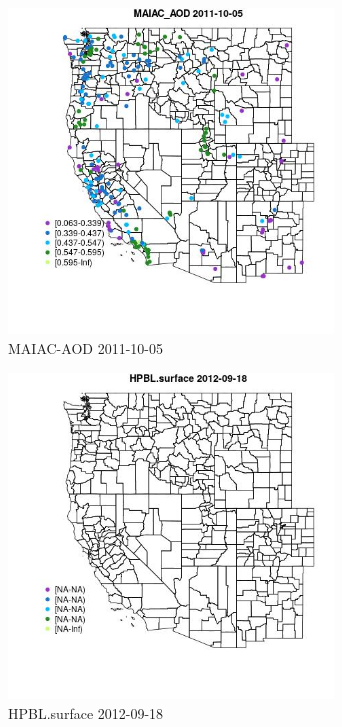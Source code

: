 \clearpage 

\begin{figure} 
\centering  
\includegraphics[width=0.77\textwidth]{Code_Outputs/ML_input_report_ML_input_PM25_Step5_part_d_de_duplicated_aves_ML_input_MapObsMAIAC_AOD2011-10-05.jpg} 
\caption{\label{fig:ML_input_report_ML_input_PM25_Step5_part_d_de_duplicated_aves_ML_inputMapObsMAIAC_AOD2011-10-05}MAIAC-AOD 2011-10-05} 
\end{figure} 
 

\begin{figure} 
\centering  
\includegraphics[width=0.77\textwidth]{Code_Outputs/ML_input_report_ML_input_PM25_Step5_part_d_de_duplicated_aves_ML_input_MapObsHPBLsurface2012-09-18.jpg} 
\caption{\label{fig:ML_input_report_ML_input_PM25_Step5_part_d_de_duplicated_aves_ML_inputMapObsHPBLsurface2012-09-18}HPBL.surface 2012-09-18} 
\end{figure} 
 

